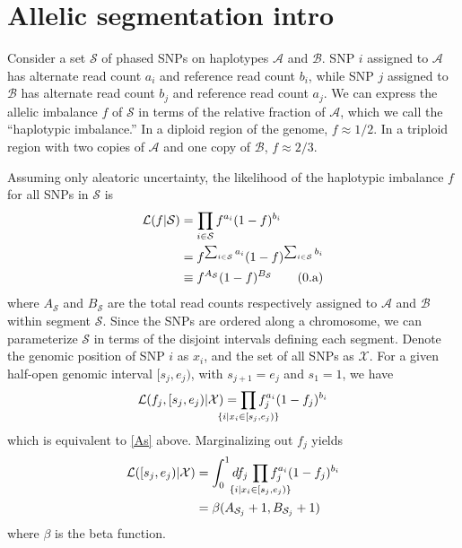 \documentclass[10pt,letter]{article}
\numberwithin{equation}{section}
\newcommand{\rt}{\right}
\newcommand{\lt}{\left}
\newcommand{\btag}[1]{\addtocounter{equation}{1}\label{#1}\tag{\arabic{section}.\alph{equation}}}
\newcommand{\textop}[1]{\operatorname{#1}}
\begin{document}
\section{Allelic segmentation intro}

Consider a set $\mathcal{S}$ of phased SNPs on haplotypes $\mathcal{A}$ and $\mathcal{B}$. SNP $i$ assigned to $\mathcal{A}$ has alternate read count $a_i$ and reference read count $b_i$, while SNP $j$ assigned to $\mathcal{B}$ has alternate read count $b_j$ and reference read count $a_j$. We can express the allelic imbalance $f$ of $\mathcal{S}$ in terms of the relative fraction of $\mathcal{A}$, which we call the ``haplotypic imbalance.'' In a diploid region of the genome, $f\approx 1/2$. In a triploid region with two copies of $\mathcal{A}$ and one copy of $\mathcal{B}$, $f\approx 2/3$.

Assuming only aleatoric uncertainty, the likelihood of the haplotypic imbalance $f$ for all SNPs in $\mathcal{S}$ is
\begin{align*}
\mathcal{L}(f|\mathcal{S}) &= \prod_{i\in\mathcal{S}} f^{a_i} (1 - f)^{b_i}\\
&= f^{\sum_{i\in\mathcal{S}} a_i}(1-f)^{\sum_{i\in\mathcal{S}} b_i}\\
&\equiv f^{A_\mathcal{S}}(1-f)^{B_\mathcal{S}}\btag{As}
\end{align*}
where $A_\mathcal{S}$ and $B_\mathcal{S}$ are the total read counts respectively assigned to $\mathcal{A}$ and $\mathcal{B}$ within segment $\mathcal{S}$. Since the SNPs are ordered along a chromosome, we can parameterize $\mathcal{S}$ in terms of the disjoint intervals defining each segment. Denote the genomic position of SNP $i$ as $x_i$, and the set of all SNPs as $\mathcal{X}$. For a given half-open genomic interval $[s_j,e_j)$, with $s_{j+1}=e_j$ and $s_1=1$, we have
\begin{align*}
\mathcal{L}(f_j,[s_j,e_j)|\mathcal{X})=\prod_{\mathclap{\{i|x_i\in [s_j, e_j)\}}} f_j^{a_i}(1 - f_j)^{b_i}
\end{align*}
which is equivalent to \eqref{As} above. Marginalizing out $f_j$ yields
\begin{align*}
\mathcal{L}([s_j,e_j)|\mathcal{X})&=\int_0^1 df_j\,\prod_{\mathclap{\{i|x_i\in [s_j, e_j)\}}} f_j^{a_i}(1 - f_j)^{b_i}\\
&= \beta(A_{\mathcal{S}_j}+1, B_{\mathcal{S}_j}+1)
\end{align*}
where $\beta$ is the beta function.
\end{document}
